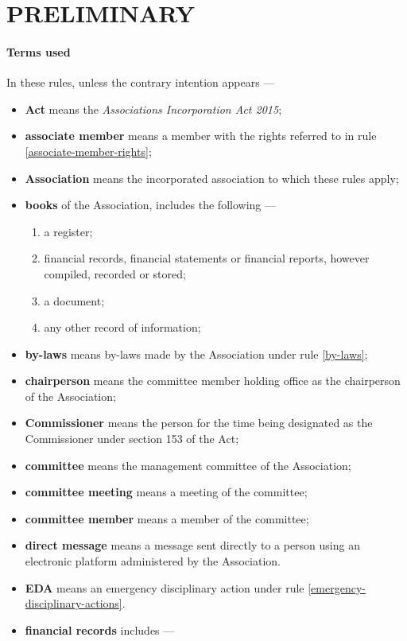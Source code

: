 \documentclass[../constitution.tex]{subfiles}
\begin{document}
\part{PRELIMINARY} \label{part-1---preliminary}

\subsection{Terms used} \label{terms-used}

In these rules, unless the contrary intention appears ---

\begin{itemize}[label={-}]
  \item \textbf{Act} means the \textit{Associations Incorporation Act 2015};
  \item \textbf{associate member} means a member with the rights referred to in rule \ref{associate-member-rights};
  \item \textbf{Association} means the incorporated association to which these rules apply;
  \item \textbf{books} of the Association, includes the following ---

        \begin{enumerate}[label=\alph*)]
          \item a register;
          \item financial records, financial statements or financial reports, however compiled, recorded or stored;
          \item a document;
          \item any other record of information;
        \end{enumerate}
  \item \textbf{by-laws} means by-laws made by the Association under rule \ref{by-laws};
  \item \textbf{chairperson} means the committee member holding office as the chairperson of the Association;
  \item \textbf{Commissioner} means the person for the time being designated as the Commissioner under section 153 of the Act;
  \item \textbf{committee} means the management committee of the Association;
  \item \textbf{committee meeting} means a meeting of the committee;
  \item \textbf{committee member} means a member of the committee;
  \item \textbf{direct message} means a message sent directly to a person using an electronic platform administered by the Association.
  \item \textbf{EDA} means an emergency disciplinary action under rule \ref{emergency-disciplinary-actions}.
  \item \textbf{financial records} includes ---


\end{itemize}
\end{document}
